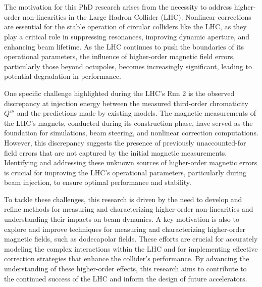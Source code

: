 \chapter{} 

The motivation for this PhD research arises from the necessity to address higher-order
non-linearities in the Large Hadron Collider (LHC). Nonlinear corrections are essential for the
stable operation of circular colliders like the LHC, as they play a critical role in suppressing
resonances, improving dynamic aperture, and enhancing beam lifetime. As the LHC continues to push
the boundaries of its operational parameters, the influence of higher-order magnetic field errors,
particularly those beyond octupoles, becomes increasingly significant, leading to potential
degradation in performance.

One specific challenge highlighted during the LHC's Run 2 is the observed discrepancy at injection
energy between the measured third-order chromaticity $Q'''$ and the predictions made by existing
models. The magnetic measurements of the LHC's magnets, conducted during its construction phase,
have served as the foundation for simulations, beam steering, and nonlinear correction computations.
However, this discrepancy suggests the presence of previously unaccounted-for field errors that are
not captured by the initial magnetic measurements. Identifying and addressing these unknown sources
of higher-order magnetic errors is crucial for improving the LHC's operational parameters,
particularly during beam injection, to ensure optimal performance and stability.

To tackle these challenges, this research is driven by the need to develop and refine methods for
measuring and characterizing higher-order non-linearities and understanding their impacts on beam
dynamics. A key motivation is also to explore and improve techniques for measuring and
characterizing higher-order magnetic fields, such as dodecapolar fields. These efforts are crucial
for accurately modeling the complex interactions within the LHC and for implementing effective
correction strategies that enhance the collider's performance. By advancing the understanding of
these higher-order effects, this research aims to contribute to the continued success of the LHC and
inform the design of future accelerators.